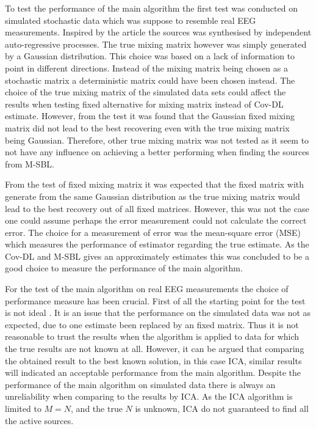 
To test the performance of the main algorithm the first test was conducted on simulated stochastic data which was suppose to resemble real EEG measurements. 
Inspired by the article \cite{cov} the sources was synthesised by independent auto-regressive processes. 
The true mixing matrix however was simply generated by a Gaussian distribution. 
This choice was based on a lack of information to point in different directions. 
Instead of the mixing matrix being chosen as a stochastic matrix a deterministic matrix could have been chosen instead. 
The choice of the true mixing matrix of the simulated data sets could affect the results when testing fixed alternative for  mixing matrix instead of Cov-DL estimate. 
However, from the test it was found that the Gaussian fixed mixing matrix did not lead to the best recovering even with the true mixing matrix being Gaussian. Therefore, other true mixing matrix was not tested as it seem to not have any influence on achieving a better performing when finding the sources from M-SBL. 

From the test of fixed mixing matrix it was expected that the fixed matrix with generate from the same Gaussian distribution as the true mixing matrix would lead to the best recovery out of all fixed matrices. 
However, this was not the case one could assume perhaps the error measurement could not calculate the correct error. 
The choice for a measurement of error was the mean-square error (MSE) which measures the performance of estimator regarding the true estimate. 
As the Cov-DL and M-SBL gives an approximately estimates this was concluded to be a good choice to measure the performance of the main algorithm. 

For the test of the main algorithm on real EEG measurements the choice of performance measure has been crucial. 
First of all the starting point for the test is not ideal . 
It is an issue that the performance on the simulated data was not as expected, due to one estimate been replaced by an fixed matrix. 
Thus it is not reasonable to trust the results when the algorithm is applied to data for which the true results are not known at all. 
However, it can be argued that comparing the obtained result to the best known solution, in this case ICA, similar results will indicated an acceptable performance from the main algorithm. 
Despite the performance of the main algorithm on simulated data there is always an unreliability when comparing to the results by ICA. 
As the ICA algorithm is limited to $M = N$, and the true $N$ is unknown, ICA do not guaranteed to find all the active sources.
 
